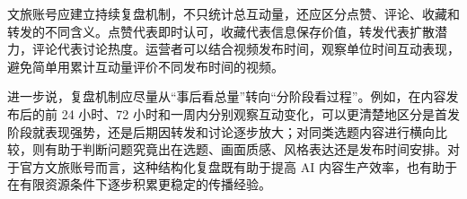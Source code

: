 文旅账号应建立持续复盘机制，不只统计总互动量，还应区分点赞、评论、收藏和转发的不同含义。点赞代表即时认可，收藏代表信息保存价值，转发代表扩散潜力，评论代表讨论热度。运营者可以结合视频发布时间，观察单位时间互动表现，避免简单用累计互动量评价不同发布时间的视频。

进一步说，复盘机制应尽量从“事后看总量”转向“分阶段看过程”。例如，在内容发布后的前 24 小时、72 小时和一周内分别观察互动变化，可以更清楚地区分是首发阶段就表现强势，还是后期因转发和讨论逐步放大；对同类选题内容进行横向比较，则有助于判断问题究竟出在选题、画面质感、风格表达还是发布时间安排。对于官方文旅账号而言，这种结构化复盘既有助于提高 AI 内容生产效率，也有助于在有限资源条件下逐步积累更稳定的传播经验。
